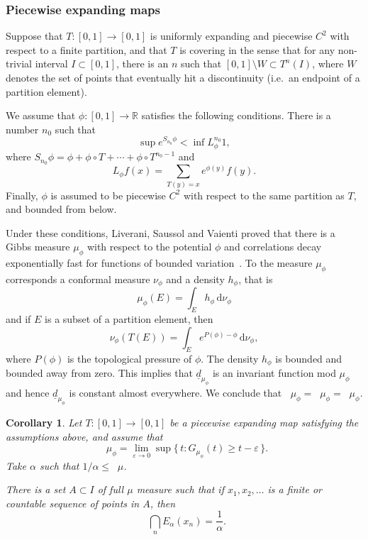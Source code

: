 \documentclass[11pt]{article}
\newtheorem{coro}[theo]{Corollary}
\theoremstyle{definition}
\numberwithin{equation}{section}
\numberwithin{figure}{section}
\numberwithin{table}{section}
\DeclareMathOperator{\dimh}{dim_H}
\DeclareMathOperator{\ldimh}{\underline{dim}_H}
\DeclareMathOperator{\udimh}{\overline{dim}_H}
\newcommand*{\dd}{\mathrm{d}}
\begin{document}
\subsubsection{Piecewise expanding maps} \label{sec:piecewise}

Suppose that $T \colon [0,1] \to [0,1]$ is uniformly expanding and piecewise $C^2$ with respect to a finite partition, and that $T$ is covering in the sense that for any non-trivial interval $I \subset [0,1]$, there is an $n$ such that $[0,1] \setminus W \subset T^n (I)$, where $W$ denotes the set of points that eventually hit a discontinuity (i.e.\ an endpoint of a partition element).

We assume that $\phi \colon [0,1] \to \mathbb{R}$ satisfies the following conditions. There is a number $n_0$ such that
\[
\sup e^{S_{n_0} \phi} < \inf L_\phi^{n_0} 1,
\]
where $S_{n_0} \phi = \phi + \phi \circ T + \cdots + \phi \circ T^{n_0-1}$ and
\[
L_\phi f (x) = \sum_{T(y) = x} e^{\phi (y)} f(y).
\]
Finally, $\phi$ is assumed to be piecewise $C^2$ with respect to the same partition as $T$, and bounded from below.

Under these conditions, Liverani, Saussol and Vaienti proved that there is a Gibbs measure $\mu_\phi$ with respect to the potential $\phi$ and correlations decay exponentially fast for functions of bounded variation~\cite[Theorem~3.1]{liveranietal}. To the measure $\mu_\phi$ corresponds a conformal measure $\nu_\phi$ and a density $h_\phi$, that is
\[
\mu_\phi (E) = \int_E h_\phi \, \dd\nu_\phi
\]
and if $E$ is a subset of a partition element, then
\[
\nu_\phi (T(E)) = \int_E e^{P(\phi) - \phi} \, \dd \nu_\phi,
\]
where $P(\phi)$ is the topological pressure of $\phi$. The density $h_\phi$ is bounded and bounded away from zero. This implies that $\underline{d}_{\mu_\phi}$ is an invariant function mod $\mu_\phi$ and hence $\underline{d}_{\mu_\phi}$ is constant almost everywhere. We conclude that $\dimh \mu_\phi = \ldimh \mu_\phi = \udimh \mu_\phi$.

\begin{coro}\label{cor:piecewise}
Let $T \colon [0,1] \to [0,1]$ be a piecewise expanding map satisfying the assumptions above, and assume that
\begin{equation}\label{eq:dim-coarse}
\dimh \mu_\phi = \lim_{\varepsilon \to 0} \sup \{\, t : G_{\mu_\phi} (t) \geq t - \varepsilon \,\}.
\end{equation}
Take $\alpha$ such that $1/\alpha \leq \dimh \mu$.

There is a set $A \subset I$ of full $\mu$ measure such that if $x_1, x_2, \ldots$ is a finite or countable sequence of points in $A$, then
\[
\dimh \bigcap_n E_\alpha (x_n) = \frac{1}{\alpha}.
\]
\end{coro}
\end{document}
